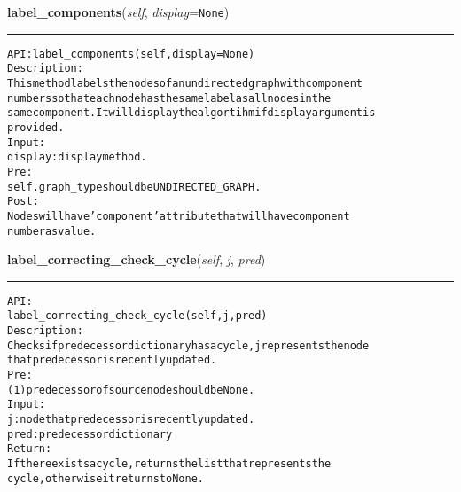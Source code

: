     \label{coinor:gimpy:graph:Graph:label_components}

    \vspace{0.5ex}

\hspace{.8\funcindent}\begin{boxedminipage}{\funcwidth}

    \raggedright \textbf{label\_components}(\textit{self}, \textit{display}={\tt None})

    \vspace{-1.5ex}

    \rule{\textwidth}{0.5\fboxrule}
\setlength{\parskip}{2ex}
\begin{alltt}

API: label\_components(self, display=None)
Description:
This method labels the nodes of an undirected graph with component
numbers so that each node has the same label as all nodes in the
same component. It will display the algortihm if display argument is
provided.
Input:
    display: display method.
Pre:
    self.graph\_type should be UNDIRECTED\_GRAPH.
Post:
    Nodes will have 'component' attribute that will have component
    number as value.
\end{alltt}

\setlength{\parskip}{1ex}
    \end{boxedminipage}

    \label{coinor:gimpy:graph:Graph:label_correcting_check_cycle}

    \vspace{0.5ex}

\hspace{.8\funcindent}\begin{boxedminipage}{\funcwidth}

    \raggedright \textbf{label\_correcting\_check\_cycle}(\textit{self}, \textit{j}, \textit{pred})

    \vspace{-1.5ex}

    \rule{\textwidth}{0.5\fboxrule}
\setlength{\parskip}{2ex}
\begin{alltt}

API:
    label\_correcting\_check\_cycle(self, j, pred)
Description:
    Checks if predecessor dictionary has a cycle, j represents the node
    that predecessor is recently updated.
Pre:
    (1) predecessor of source node should be None.
Input:
    j: node that predecessor is recently updated.
    pred: predecessor dictionary
Return:
    If there exists a cycle, returns the list that represents the
    cycle, otherwise it returns to None.
\end{alltt}

\setlength{\parskip}{1ex}
    \end{boxedminipage}

